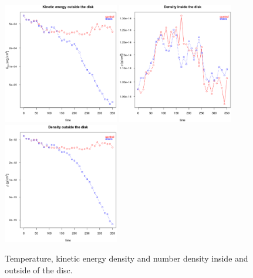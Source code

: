 \documentclass[a4paper,12pt]{article}
\begin{document}
\begin{figure}[!ht]
\begin{center}
  \includegraphics[width=0.45\textwidth]{figs/enkin_vs_t_outside.eps}
  \includegraphics[width=0.45\textwidth]{figs/dens_vs_t_disco.eps}
  \includegraphics[width=0.45\textwidth]{figs/dens_vs_t_outside.eps}
    \caption{Temperature, kinetic energy density and number density inside and outside of the disc.}

\label{tempkindens}
 \end{center}
\end{figure}
\end{document}
